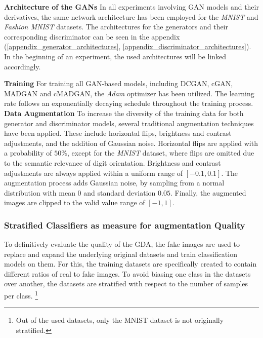 \noindent\textbf{Architecture of the GANs}
In all experiments involving GAN models and their derivatives, the same network architecture has been employed for the \textit{MNIST} and \textit{Fashion MNIST} datasets. The architectures for the generators and their corresponding discriminator can be seen in the appendix (\ref{appendix_generator_architectures}, \ref{appendix_discriminator_architectures}). In the beginning of an experiment, the used architectures will be linked accordingly.

\noindent\textbf{Training}
For training all GAN-based models, including DCGAN, cGAN, MADGAN and cMADGAN, the \textit{Adam} optimizer has been utilized. The learning rate follows an exponentially decaying schedule throughout the training process.\\

\noindent\textbf{Data Augmentation}\label{body_experiment_dataaugmentation}
To increase the diversity of the training data for both generator and discriminator models, several traditional augmentation techniques have been applied. These include horizontal flips, brightness and contrast adjustments, and the addition of Gaussian noise.
Horizontal flips are applied with a probability of \(50\%\), except for the \textit{MNIST} dataset, where flips are omitted due to the semantic relevance of digit orientation. Brightness and contrast adjustments are always applied within a uniform range of \([-0.1, 0.1]\). The augmentation process adds Gaussian noise, by sampling from a normal distribution with mean \(0\) and standard deviation \(0.05\). Finally, the augmented images are clipped to the valid value range of \([-1, 1]\).

\subsubsection{Stratified Classifiers as measure for augmentation Quality}
To definitively evaluate the quality of the GDA, the fake images are used to replace and expand the underlying original datasets and train classification models on them. For this, the training datasets are specifically created to contain different ratios of real to fake images. To avoid biasing one class in the datasets over another, the datasets are stratified with respect to the number of samples per class. \footnote{Out of the used datasets, only the MNIST dataset is not originally stratified.} 

